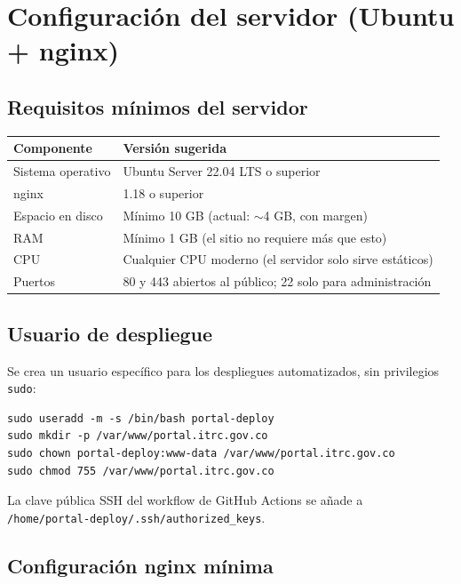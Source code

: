 \documentclass[11pt,a4paper]{article}
\begin{document}
\newpage

\section{Configuración del servidor (Ubuntu + nginx)}

\subsection{Requisitos mínimos del servidor}

\begin{center}
\begin{tabular}{@{}ll@{}}
\toprule
\textbf{Componente} & \textbf{Versión sugerida} \\
\midrule
Sistema operativo & Ubuntu Server 22.04 LTS o superior \\
nginx & 1.18 o superior \\
Espacio en disco & Mínimo 10 GB (actual: $\sim$4 GB, con margen) \\
RAM & Mínimo 1 GB (el sitio no requiere más que esto) \\
CPU & Cualquier CPU moderno (el servidor solo sirve estáticos) \\
Puertos & 80 y 443 abiertos al público; 22 solo para administración \\
\bottomrule
\end{tabular}
\end{center}

\subsection{Usuario de despliegue}

Se crea un usuario específico para los despliegues automatizados, sin privilegios \texttt{sudo}:

\begin{verbatim}
sudo useradd -m -s /bin/bash portal-deploy
sudo mkdir -p /var/www/portal.itrc.gov.co
sudo chown portal-deploy:www-data /var/www/portal.itrc.gov.co
sudo chmod 755 /var/www/portal.itrc.gov.co
\end{verbatim}

La clave pública SSH del workflow de GitHub Actions se añade a\\\texttt{/home/portal-deploy/.ssh/authorized\_keys}.

\subsection{Configuración nginx mínima}
\end{document}
